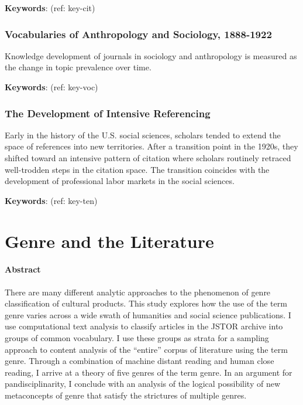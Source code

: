 \documentclass[]{book}
\theoremstyle{definition}
\theoremstyle{definition}
\theoremstyle{definition}
\theoremstyle{remark}
\begin{document}
\textbf{Keywords}: (ref: key-cit)

\hypertarget{vocabularies-of-anthropology-and-sociology-1888-1922}{%
\subsection*{Vocabularies of Anthropology and Sociology,
1888-1922}\label{vocabularies-of-anthropology-and-sociology-1888-1922}}




Knowledge development of journals in sociology and
anthropology is measured as the change in topic prevalence over time.




\textbf{Keywords}: (ref: key-voc)

\hypertarget{the-development-of-intensive-referencing}{%
\subsection*{The Development of Intensive
Referencing}\label{the-development-of-intensive-referencing}}








Early in the history of the U.S. social sciences, scholars
tended to extend the space of references into new territories. After a
transition point in the 1920s, they shifted toward an intensive pattern
of citation where scholars routinely retraced well-trodden steps in the
citation space. The transition coincides with the development of
professional labor markets in the social sciences.




\textbf{Keywords}: (ref: key-ten)

\hypertarget{int}{%
\chapter{Genre and the Literature}\label{int}}

\hypertarget{abstract}{%
\subsubsection*{Abstract}\label{abstract}}


There are many different analytic approaches to the
phenomenon of genre classification of cultural products. This study
explores how the use of the term genre varies across a wide swath of
humanities and social science publications. I use computational text
analysis to classify articles in the JSTOR archive into groups of common
vocabulary. I use these groups as strata for a sampling approach to
content analysis of the ``entire'' corpus of literature using the term
genre. Through a combination of machine distant reading and human close
reading, I arrive at a theory of five genres of the term genre. In an
argument for pandisciplinarity, I conclude with an analysis of the
logical possibility of new metaconcepts of genre that satisfy the
strictures of multiple genres.
\end{document}
